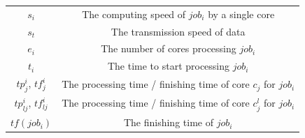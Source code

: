 \documentclass{llncs}
\begin{document}
\begin{appendices}
\begin{table}[htbp]
\begin{center}
\begin{tabular}{c|c}
$s_i$ & The computing speed of $job_i$ by a single core\\
$s_t$ & The transmission speed of data \\
$e_i$ & The number of cores processing $job_i$\\ 
$t_i$ & The time to start processing $job_i$\\
$tp^i_j$, $tf^i_{j}$ & The processing time / finishing time of core $c_j$ for $job_i$\\
$tp^i_{lj}$, $tf^i_{lj}$ & The processing time / finishing time of core $c^l_j$ for $job_i$\\
$tf(job_i)$ & The finishing time of $job_i$ \\
 
\bottomrule
\end{tabular}
\label{tabSYMBOLS}
\end{center}
\end{table}

\end{appendices}





\end{document}
